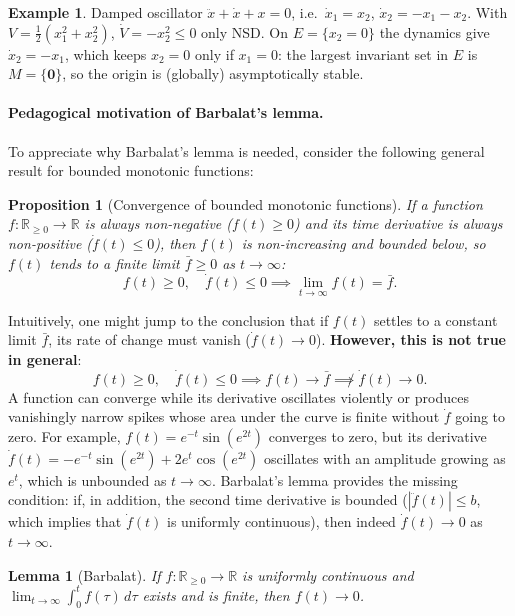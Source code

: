 \documentclass[11pt,a4paper]{article}
\newcommand{\R}{\mathbb{R}}
\theoremstyle{plain}
\newtheorem{lemma}[theorem]{Lemma}
\newtheorem{proposition}[theorem]{Proposition}
\theoremstyle{definition}
\newtheorem{example}[theorem]{Example}
\theoremstyle{remark}
\begin{document}
\begin{example}\label{ex:osc}
Damped oscillator $\ddot x+\dot x+x=0$, i.e.\ $\dot x_1=x_2$, $\dot x_2=-x_1-x_2$. With $V=\frac12(x_1^2+x_2^2)$, $\dot V=-x_2^2\le0$ only NSD. On $E=\{x_2=0\}$ the dynamics give $\dot x_2=-x_1$, which keeps $x_2=0$ only if $x_1=0$: the largest invariant set in $E$ is $M=\{\bm 0\}$, so the origin is (globally) asymptotically stable.
\end{example}

\paragraph{Pedagogical motivation of Barbalat's lemma.}
To appreciate why Barbalat's lemma is needed, consider the following general result for bounded monotonic functions:
\begin{proposition}[Convergence of bounded monotonic functions]
If a function $f:\R_{\ge0}\to\R$ is always non-negative ($f(t)\ge0$) and its time derivative is always non-positive ($\dot f(t)\le0$), then $f(t)$ is non-increasing and bounded below, so $f(t)$ tends to a finite limit $\bar f\ge0$ as $t\to\infty$:
\[
f(t)\ge0,\quad \dot f(t)\le0 \implies \lim_{t\to\infty}f(t)=\bar f .
\]
\end{proposition}

Intuitively, one might jump to the conclusion that if $f(t)$ settles to a constant limit $\bar f$, its rate of change must vanish ($\dot f(t)\to0$). \textbf{However, this is not true in general}:
\[
f(t)\ge0,\quad \dot f(t)\le0 \implies f(t)\to\bar f \not\implies \dot f(t)\to0 .
\]
A function can converge while its derivative oscillates violently or produces vanishingly narrow spikes whose area under the curve is finite without $\dot f$ going to zero. For example, $f(t)=e^{-t}\sin(e^{2t})$ converges to zero, but its derivative $\dot f(t)=-e^{-t}\sin(e^{2t})+2e^t\cos(e^{2t})$ oscillates with an amplitude growing as $e^t$, which is unbounded as $t\to\infty$.
Barbalat's lemma provides the missing condition: if, in addition, the second time derivative is bounded ($|\ddot f(t)|\le b$, which implies that $\dot f(t)$ is uniformly continuous), then indeed $\dot f(t)\to0$ as $t\to\infty$.

\begin{lemma}[Barbalat]\label{lem:barbalat}
If $f:\R_{\ge0}\to\R$ is uniformly continuous and $\lim_{t\to\infty}\int_0^tf(\tau)\,d\tau$ exists and is finite, then $f(t)\to0$.
\end{lemma}
\end{document}

